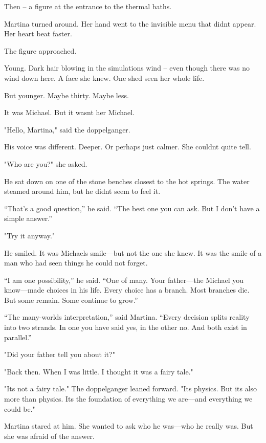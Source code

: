 \documentclass[
]{article}
\begin{document}
Then -- a figure at the entrance to the thermal baths.

Martina turned around. Her hand went to the invisible menu that didn\textquotesingle t appear. Her heart beat faster.

The figure approached.

Young. Dark hair blowing in the simulation\textquotesingle s wind -- even though there was no wind down here. A face she knew. One she\textquotesingle d seen her whole life.

But younger. Maybe thirty. Maybe less.

It was Michael. But it wasn\textquotesingle t her Michael.

"Hello, Martina," said the doppelganger.

His voice was different. Deeper. Or perhaps just calmer. She couldn\textquotesingle t quite tell.

"Who are you?" she asked.

He sat down on one of the stone benches closest to the hot springs. The water steamed around him, but he didn\textquotesingle t seem to feel it.

``That's a good question,'' he said. ``The best one you can ask. But I don't have a simple answer.''

"Try it anyway."

He smiled. It was Michael\textquotesingle s smile---but not the one she knew. It was the smile of a man who had seen things he could not forget.

``I am one possibility,'' he said. ``One of many. Your father---the Michael you know---made choices in his life. Every choice has a branch. Most branches die. But some remain. Some continue to grow.''

``The many-worlds interpretation,'' said Martina. ``Every decision splits reality into two strands. In one you have said yes, in the other no. And both exist in parallel.''

"Did your father tell you about it?"

"Back then. When I was little. I thought it was a fairy tale."

"It\textquotesingle s not a fairy tale." The doppelganger leaned forward. "It\textquotesingle s physics. But it\textquotesingle s also more than physics. It\textquotesingle s the foundation of everything we are---and everything we could be."

Martina stared at him. She wanted to ask who he was---who he really was. But she was afraid of the answer.
\end{document}
